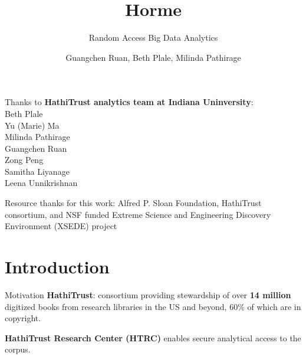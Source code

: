 \documentclass[newPxFont]{beamer}
\title{Horme}
\subtitle{Random Access Big Data Analytics}
\author{Guangchen Ruan, Beth Plale, Milinda Pathirage}
\institute{School of Informatics and Computing, Indiana University}
\begin{document}

%
%

\maketitle


%
%


\begin{frame}[c]{Thanks to}
 \textbf{HathiTrust analytics team at Indiana Uninversity}: \\
 Beth Plale \\
 Yu (Marie) Ma \\
 Milinda Pathirage \\
 Guangchen Ruan \\
 Zong Peng \\
 Samitha Liyanage \\
 Leena Unnikrishnan  
 
 
\vspace{1em}

Resource thanks for this work:  Alfred P. Sloan Foundation, HathiTrust consortium, and NSF funded Extreme Science and Engineering Discovery Environment (XSEDE) project
\end{frame}

\section{Introduction}


\begin{frame}[c]{Motivation}
\textbf{HathiTrust}:  consortium providing stewardship of over \textbf{14 million} digitized books from research libraries in the US and beyond, 60\% of which are in copyright.  

\vspace{1em}
\textbf{HathiTrust Research Center (HTRC)} enables secure analytical access to the corpus.  
\end{frame}
\end{document}
